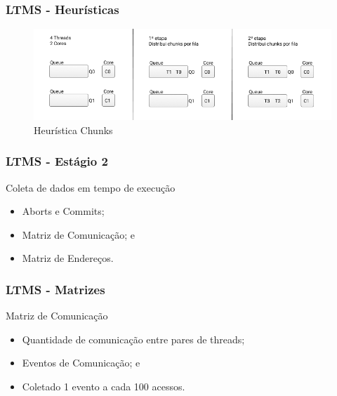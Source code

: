 \documentclass[10pt, pdf,xcolor=pdftex,dvipsnames,table]{beamer}
\begin{document}
\begin{frame} \frametitle{LTMS - Heurísticas}
    \begin{figure}[!h]
        \includegraphics[scale=0.4]{images/Queue_chunks}
        \caption{Heurística Chunks}
        \label{fig:abusy}
    \end{figure}
\end{frame}

\begin{frame} \frametitle{LTMS - Estágio 2}
    \begin{block}{Coleta de dados em tempo de execução}
        \begin{itemize}
        	\item Aborts e Commits;
        	\item Matriz de Comunicação; e 
        	\item Matriz de Endereços.
        \end{itemize}
    \end{block}
\end{frame}

\begin{frame} \frametitle{LTMS - Matrizes}
    \begin{block}{Matriz de Comunicação}
        \begin{itemize}
        	\item Quantidade de comunicação entre pares de threads;
        	\item Eventos de Comunicação; e
        	\item Coletado 1 evento a cada 100 acessos.
        \end{itemize}
    \end{block}
\end{frame}
\end{document}
